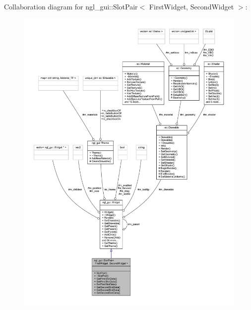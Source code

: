 Collaboration diagram for ngl\+\_\+gui\+:\+:Slot\+Pair$<$ First\+Widget, Second\+Widget $>$\+:
\nopagebreak
\begin{figure}[H]
\begin{center}
\leavevmode
\includegraphics[width=350pt]{classngl__gui_1_1_slot_pair__coll__graph}
\end{center}
\end{figure}

